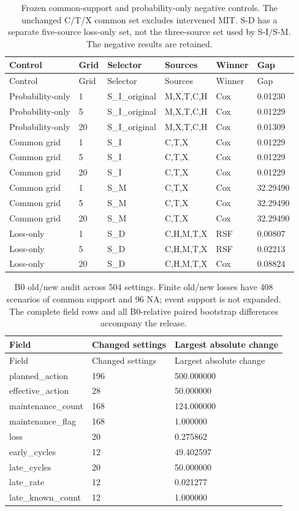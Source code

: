 \begin{longtable}{llllll}
\caption{Frozen common-support and probability-only negative controls. The unchanged C/T/X common set excludes intervened MIT. S-D has a separate five-source loss-only set, not the three-source set used by S-I/S-M. The negative results are retained.}\label{tab:v62_common}\\
\toprule
Control & Grid & Selector & Sources & Winner & Gap\\\midrule\endfirsthead
Control & Grid & Selector & Sources & Winner & Gap\\\midrule\endhead
Probability-only & 1 & S\_I\_original & M,X,T,C,H & Cox & 0.01230\\
Probability-only & 5 & S\_I\_original & M,X,T,C,H & Cox & 0.01229\\
Probability-only & 20 & S\_I\_original & M,X,T,C,H & Cox & 0.01309\\
Common grid & 1 & S\_I & C,T,X & Cox & 0.01229\\
Common grid & 5 & S\_I & C,T,X & Cox & 0.01229\\
Common grid & 20 & S\_I & C,T,X & Cox & 0.01229\\
Common grid & 1 & S\_M & C,T,X & Cox & 32.29490\\
Common grid & 5 & S\_M & C,T,X & Cox & 32.29490\\
Common grid & 20 & S\_M & C,T,X & Cox & 32.29490\\
Loss-only & 1 & S\_D & C,H,M,T,X & RSF & 0.00807\\
Loss-only & 5 & S\_D & C,H,M,T,X & RSF & 0.02213\\
Loss-only & 20 & S\_D & C,H,M,T,X & Cox & 0.08824\\
\bottomrule\end{longtable}

\begin{longtable}{lll}
\caption{B0 old/new audit across 504 settings. Finite old/new losses have 408 scenarios of common support and 96 NA; event support is not expanded. The complete field rows and all B0-relative paired bootstrap differences accompany the release.}\label{tab:v62_b0}\\
\toprule
Field & Changed settings & Largest absolute change\\\midrule\endfirsthead
Field & Changed settings & Largest absolute change\\\midrule\endhead
planned\_action & 196 & 500.000000\\
effective\_action & 28 & 50.000000\\
maintenance\_count & 168 & 124.000000\\
maintenance\_flag & 168 & 1.000000\\
loss & 20 & 0.275862\\
early\_cycles & 12 & 49.402597\\
late\_cycles & 20 & 50.000000\\
late\_rate & 12 & 0.021277\\
late\_known\_count & 12 & 1.000000\\
\bottomrule\end{longtable}

